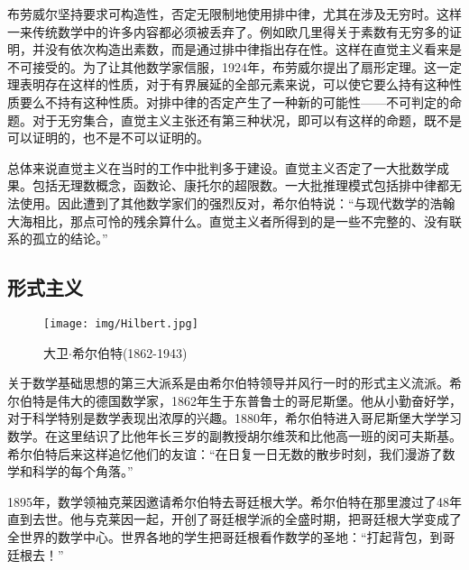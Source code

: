 \documentclass[b5paper]{ctexart}
\begin{document}
布劳威尔坚持要求可构造性，否定无限制地使用排中律，尤其在涉及无穷时。这样一来传统数学中的许多内容都必须被丢弃了。例如欧几里得关于素数有无穷多的证明，并没有依次构造出素数，而是通过排中律指出存在性。这样在直觉主义看来是不可接受的。为了让其他数学家信服，1924年，布劳威尔提出了扇形定理。这一定理表明存在这样的性质，对于有界展延的全部元素来说，可以使它要么持有这种性质要么不持有这种性质。对排中律的否定产生了一种新的可能性——不可判定的命题。对于无穷集合，直觉主义主张还有第三种状况，即可以有这样的命题，既不是可以证明的，也不是不可以证明的。

总体来说直觉主义在当时的工作中批判多于建设。直觉主义否定了一大批数学成果。包括无理数概念，函数论、康托尔的超限数。一大批推理模式包括排中律都无法使用。因此遭到了其他数学家们的强烈反对，希尔伯特说：“与现代数学的浩翰大海相比，那点可怜的残余算什么。直觉主义者所得到的是一些不完整的、没有联系的孤立的结论。”


\subsection{形式主义}

\begin{wrapfigure}{L}{0.5\textwidth}
 \centering
 \texttt{[image: img/Hilbert.jpg]}
 \caption{大卫$\cdot$希尔伯特(1862-1943)}
 \label{fig:Hilbert}
\end{wrapfigure}

关于数学基础思想的第三大派系是由希尔伯特领导并风行一时的形式主义流派。希尔伯特是伟大的德国数学家，1862年生于东普鲁士的哥尼斯堡。他从小勤奋好学，对于科学特别是数学表现出浓厚的兴趣。1880年，希尔伯特进入哥尼斯堡大学学习数学。在这里结识了比他年长三岁的副教授胡尔维茨和比他高一班的闵可夫斯基。希尔伯特后来这样追忆他们的友谊：“在日复一日无数的散步时刻，我们漫游了数学和科学的每个角落。”


1895年，数学领袖克莱因邀请希尔伯特去哥廷根大学。希尔伯特在那里渡过了48年直到去世。他与克莱因一起，开创了哥廷根学派的全盛时期，把哥廷根大学变成了全世界的数学中心。世界各地的学生把哥廷根看作数学的圣地：“打起背包，到哥廷根去！”
\end{document}
